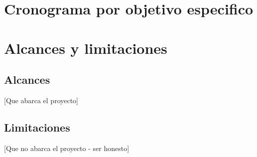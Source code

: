 \documentclass[12pt,a4paper]{article}
\begin{document}

\section{Cronograma por objetivo especifico}


\section{Alcances y limitaciones}

\subsection{Alcances}
[Que abarca el proyecto]

\subsection{Limitaciones}
[Que no abarca el proyecto - ser honesto]

\end{document}
